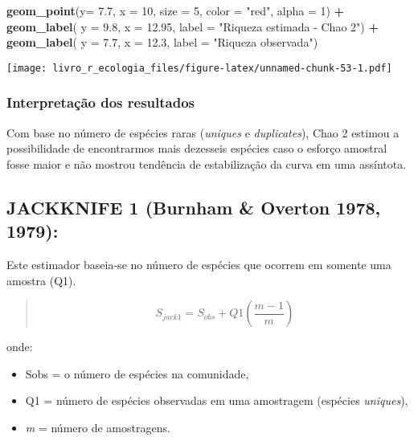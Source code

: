 \documentclass[
]{book}
\newenvironment{Shaded}{\begin{snugshade}}{\end{snugshade}}
\newcommand{\DataTypeTok}[1]{\textcolor[rgb]{0.13,0.29,0.53}{#1}}
\newcommand{\DecValTok}[1]{\textcolor[rgb]{0.00,0.00,0.81}{#1}}
\newcommand{\FloatTok}[1]{\textcolor[rgb]{0.00,0.00,0.81}{#1}}
\newcommand{\KeywordTok}[1]{\textcolor[rgb]{0.13,0.29,0.53}{\textbf{#1}}}
\newcommand{\NormalTok}[1]{#1}
\newcommand{\OperatorTok}[1]{\textcolor[rgb]{0.81,0.36,0.00}{\textbf{#1}}}
\newcommand{\StringTok}[1]{\textcolor[rgb]{0.31,0.60,0.02}{#1}}
\begin{document}
\begin{Shaded}
\begin{Highlighting}[]
\StringTok{  }\KeywordTok{geom_point}\NormalTok{(}\DataTypeTok{y=} \FloatTok{7.7}\NormalTok{, }\DataTypeTok{x =} \DecValTok{10}\NormalTok{, }\DataTypeTok{size =} \DecValTok{5}\NormalTok{, }\DataTypeTok{color =} \StringTok{"red"}\NormalTok{, }\DataTypeTok{alpha =} \DecValTok{1}\NormalTok{) }\OperatorTok{+}\StringTok{ }
\StringTok{  }\KeywordTok{geom_label}\NormalTok{( }\DataTypeTok{y =} \FloatTok{9.8}\NormalTok{, }\DataTypeTok{x =} \FloatTok{12.95}\NormalTok{, }\DataTypeTok{label =} \StringTok{"Riqueza estimada - Chao 2"}\NormalTok{) }\OperatorTok{+}
\StringTok{  }\KeywordTok{geom_label}\NormalTok{( }\DataTypeTok{y =} \FloatTok{7.7}\NormalTok{, }\DataTypeTok{x =} \FloatTok{12.3}\NormalTok{, }\DataTypeTok{label =} \StringTok{"Riqueza observada"}\NormalTok{)}
\end{Highlighting}
\end{Shaded}

\texttt{[image: livro\_r\_ecologia\_files/figure-latex/unnamed-chunk-53-1.pdf]}

\hypertarget{interpretauxe7uxe3o-dos-resultados-2}{%
\subsubsection{Interpretação dos resultados}\label{interpretauxe7uxe3o-dos-resultados-2}}

Com base no número de espécies raras (\emph{uniques} e \emph{duplicates}), Chao 2 estimou a possibilidade de encontrarmos mais dezesseis espécies caso o esforço amostral fosse maior e não mostrou tendência de estabilização da curva em uma assíntota.

\hypertarget{jackknife-1-burnham-overton-1978-1979}{%
\subsection{JACKKNIFE 1 (Burnham \& Overton 1978, 1979):}\label{jackknife-1-burnham-overton-1978-1979}}

Este estimador baseia-se no número de espécies que ocorrem em somente uma amostra (Q1).

\begin{quote}
\[S_{jack1} = S_{obs} + Q1\left(\frac{m - 1}{m}\right)\]
\end{quote}

onde:

\begin{itemize}
\item
  Sobs = o número de espécies na comunidade,
\item
  Q1 = número de espécies observadas em uma amostragem (espécies \emph{uniques}),
\item
  \emph{m} = número de amostragens.
\end{itemize}
\end{document}
